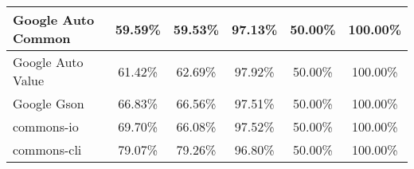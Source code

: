 \documentclass[../main]{subfiles}
\begin{document}
\begin{table}[!htb]
\begin{tabular}{|l|c|c|c|c|c|}
Google Auto Common            & 59.59\%                                                                                 & 59.53\%                                                                                     & 97.13\%                                                                              & 50.00\%                                                                               & 100.00\%                                                                             \\ \hline
Google Auto Value             & 61.42\%                                                                                 & 62.69\%                                                                                     & 97.92\%                                                                              & 50.00\%                                                                               & 100.00\%                                                                             \\ \hline
Google Gson                   & 66.83\%                                                                                 & 66.56\%                                                                                     & 97.51\%                                                                              & 50.00\%                                                                               & 100.00\%                                                                             \\ \hline
commons-io                    & 69.70\%                                                                                 & 66.08\%                                                                                     & 97.52\%                                                                              & 50.00\%                                                                               & 100.00\%                                                                             \\ \hline
commons-cli                   & 79.07\%                                                                                 & 79.26\%                                                                                     & 96.80\%                                                                              & 50.00\%                                                                               & 100.00\%                                                                             \\ \hline

\end{tabular}
\end{table}
\end{document}
